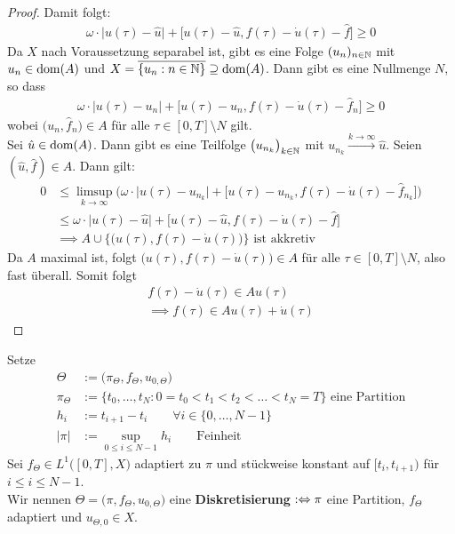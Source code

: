 \begin{proof}
	Damit folgt:
	\begin{align*}
		\omega\cdot\big|u(\tau)-\hat{u}\big|+\big[u(\tau)-\hat{u},f(\tau)-\dot{u}(\tau)-\hat{f}\big]\geq0
	\end{align*}
	Da $X$ nach Voraussetzung separabel ist, gibt es eine Folge $(u_n)_{n\in\mathbb{N}}$ mit $u_n\in\operatorname{dom}(A)$ und $X=\overline{\lbrace u_n:n\in\mathbb{N}\rbrace}\supseteq\operatorname{dom}(A)$. 
	Dann gibt es eine Nullmenge $N$, so dass
	\begin{align*}
		\omega\cdot\big|u(\tau)-u_n\big|+\big[u(\tau)-u_n,f(\tau)-\dot{u}(\tau)-\hat{f}_n\big]\geq0 
	\end{align*}
	wobei $\big(u_n,\hat{f}_n\big)\in A$ für alle $\tau\in[0,T]\setminus N$ gilt.\\
	Sei $\hat{u}\in\operatorname{dom}(A)$. Dann gibt es eine Teilfolge $\big(u_{n_k}\big)_{k\in\mathbb{N}}$ mit $u_{n_k}\stackrel{k\to\infty}{\longrightarrow}\hat{u}$. 
	Seien $(\hat{u},\hat{f})\in A$. 
	Dann gilt:
	\begin{align*}
		0&\leq\limsup\limits_{k\to\infty}\Big(\omega\cdot\big|u(\tau)-u_{n_k}\big|+\big[u(\tau)-u_{n_k},f(\tau)-\dot{u}(\tau)-\hat{f}_{n_k}\big]\Big)\\
		&\leq\omega\cdot\big|u(\tau)-\hat{u}\big|+\big[u(\tau)-\hat{u},f(\tau)-\dot{u}(\tau)-\hat{f}\big]\\
		&\implies
		A\cup\Big\lbrace\big(u(\tau),f(\tau)-\dot{u}(\tau)\big)\Big\rbrace\text{ ist akkretiv}
	\end{align*}
	Da $A$ maximal ist, folgt $\big(u(\tau),f(\tau)-\dot{u}(\tau)\big)\in A$ für alle $\tau\in[0,T]\setminus N$, also fast überall. 
	Somit folgt
	\begin{align*}
		f(\tau)-\dot{u}(\tau)\in A u(\tau)\\
		\implies f(\tau)\in A u(\tau)+\dot{u}(\tau)
	\end{align*}
\end{proof}

\begin{definition}
	Setze
	\begin{align*}
		\Theta&:=\big(\pi_\Theta,f_\Theta,u_{0,\Theta}\big)\\
		\pi_\Theta&:=\big\lbrace t_0,\ldots,t_N: 0=t_0<t_1<t_2<\ldots<t_N=T\big\rbrace\text{ eine Partition}\\
		h_i&:=t_{i+1}-t_i\qquad\forall i\in\lbrace0,\ldots,N-1\rbrace\\
		|\pi|&:=\sup\limits_{0\leq i\leq N-1} h_i\qquad\text{Feinheit}
	\end{align*}
	Sei $f_\Theta\in L^1\big([0,T],X\big)$ adaptiert zu $\pi$ und stückweise konstant auf $[t_i,t_{i+1})$ für $i\leq i\leq N-1$.\\
	Wir nennen $\Theta=\big(\pi,f_\Theta,u_{0,\Theta}\big)$ eine \textbf{Diskretisierung} $:\Leftrightarrow\pi$ eine Partition, $f_\Theta$ adaptiert und $u_{\Theta,0}\in X$.
\end{definition}

